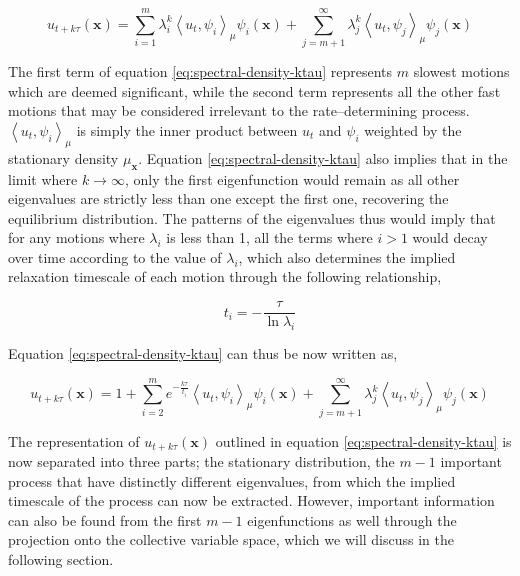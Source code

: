 \begin{spacing}{2.0}
    \begin{equation}
        u_{t+k\tau}(\mathbf{x}) = \sum_{i=1}^m \lambda_i^k\left<u_t,\psi_i\right>_{\mu}\psi_i(\mathbf{x}) + 
            \sum_{j=m+1}^{\infty} \lambda_j^k\left<u_t,\psi_j\right>_{\mu}\psi_j(\mathbf{x})
        \label{eq:spectral-density-ktau}
    \end{equation}

    The first term of equation \ref{eq:spectral-density-ktau} represents $m$ slowest motions which are deemed significant, while the second term 
    represents all the other fast motions that may be considered irrelevant to the rate--determining process. $\left<u_t,\psi_i\right>_{\mu}$ 
    is simply the inner product between $u_t$ and $\psi_i$ weighted by the stationary density $\mu_{\mathbf{x}}$. Equation \ref{eq:spectral-density-ktau}
    also implies that in the limit where $k\to\infty$, only the first eigenfunction would remain as all other eigenvalues are strictly less than 
    one except the first one, recovering the equilibrium distribution. The patterns of the eigenvalues thus would imply that for any motions where
    $\lambda_i$ is less than 1, all the terms where $i > 1$ would decay over time according to the value of $\lambda_i$, which also determines the 
    implied relaxation timescale of each motion through the following relationship,

    \begin{equation}
        t_i = -\frac{\tau}{\ln\lambda_i}
    \end{equation}

    Equation \ref{eq:spectral-density-ktau} can thus be now written as,

    \begin{equation}
        u_{t+k\tau}(\mathbf{x}) = 1 + \sum_{i=2}^m e^{-\frac{k\tau}{t_i}}\left<u_t,\psi_i\right>_{\mu}\psi_i(\mathbf{x}) +
            \sum_{j=m+1}^{\infty} \lambda_j^k\left<u_t,\psi_j\right>_{\mu}\psi_j(\mathbf{x})
        \label{eq:spectral-density-ktau-2}
    \end{equation}

    The representation of $u_{t+k\tau}(\mathbf{x})$ outlined in equation \ref{eq:spectral-density-ktau} is now separated into three parts; the stationary 
    distribution, the $m-1$ important process that have distinctly different eigenvalues, from which the implied timescale of the process can now 
    be extracted. However, important information can also be found from the first $m-1$ eigenfunctions as well through the projection onto the 
    collective variable space, which we will discuss in the following section.
\end{spacing}
